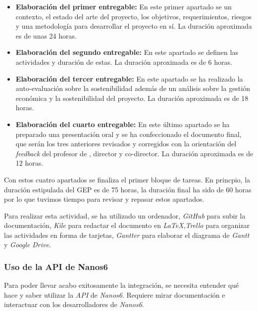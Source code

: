 \begin{itemize}
 \item \textbf{Elaboración del primer entregable:} En este primer apartado se  un contexto, el estado del arte del proyecto, los objetivos, requerimientos, riesgos y una metodología para desarrollar el proyecto en sí. La duración aproximada es de unas 24 horas.
 \item \textbf{Elaboración del segundo entregable:} En este apartado se definen las actividades y duración de estas. La duración aproximada es de 6 horas.
 \item \textbf{Elaboración del tercer entregable:} En este apartado se ha realizado la auto-evaluación sobre la sostenibilidad además de un análisis sobre la gestión económica y la sostenibilidad del proyecto. La duración aproximada es de 18 horas.
 \item \textbf{Elaboración del cuarto entregable:} En este último apartado se ha preparado una presentación oral y se ha confeccionado el documento final, que serán los tres anteriores revisados y corregidos con la orientación del \textit{feedback} del profesor de \textit{}, director y co-director. La duración aproximada es de 12 horas.
\end{itemize}

Con estos cuatro apartados se finaliza el primer bloque de tareas. En princpio, la duración estipulada del GEP es de 75 horas, la duración final ha sido de 60 horas por lo que tuvimos tiempo para revisar y repasar estos apartados.

\par\bigskip

Para realizar esta actividad, se ha utilizado un ordenador, \textit{GitHub} para subir la documentación, \textit{Kile} para redactar el documento en \textit{LaTeX},\textit{Trello} para organizar las actividades en forma de tarjetas, \textit{Gantter} para elaborar el diagrama de \textit{Gantt} y \textit{Google Drive}.

\subsubsection{Uso de la API de Nanos6}

Para poder llevar acabo exitosamente la integración, se necesita entender qué hace y saber utilizar la \textit{API} de \textit{Nanos6}. Requiere mirar documentación e interactuar con los desarrolladores de \textit{Nanos6}. 
\par\bigskip

